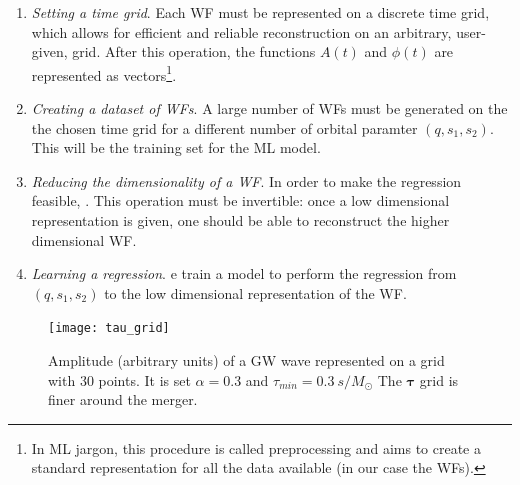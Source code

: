 \begin{enumerate}[label=(\Alph*)]
	\item \textit{Setting a time grid}. Each WF must be represented on a discrete time grid, which allows for efficient and reliable reconstruction on an arbitrary, user-given, grid. After this operation, the functions $A(t)$ and $\phi(t)$ are represented as vectors\footnote{
In ML jargon, this procedure is called preprocessing and aims to create a standard representation for all the data available (in our case the WFs).
}.
	\item \textit{Creating a dataset of WFs}. A large number of WFs must be generated on the the chosen time grid for a different number of orbital paramter $(q,s_1,s_2)$. This will be the training set for the ML model.
	\item \textit{Reducing the dimensionality of a WF}. In order
          to make the regression feasible, . This operation must be invertible: once a low dimensional representation is given, one should be able to reconstruct the higher dimensional WF.
	\item \textit{Learning a regression}. e train a model to perform the regression from $(q, s_1, s_2)$ to the low dimensional representation of the WF.
\end{enumerate}

\begin{figure}[!t]
	\centering
	\texttt{[image: tau\_grid]}
	\caption{Amplitude (arbitrary units) of a GW wave represented on a grid with 30 points.
It is set $\alpha = 0.3$ and $\tau_{min} = \SI{0.3}{s/M_\odot}$
The $\boldsymbol{\tau}$ grid is finer around the merger.
}
	\label{fig:tau_grid}
\end{figure}
%
